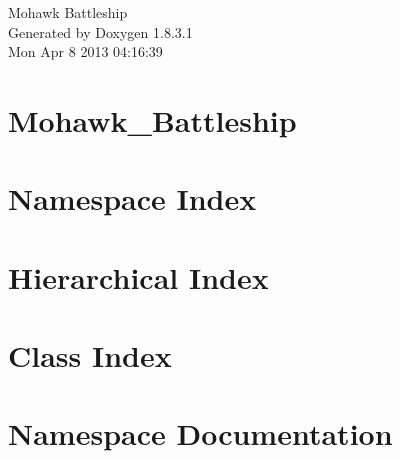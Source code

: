 \documentclass{book}
\begin{document}
\hypersetup{pageanchor=false,citecolor=blue}
\begin{titlepage}
\vspace*{7cm}
\begin{center}
{\Large Mohawk Battleship }\\
\vspace*{1cm}
{\large Generated by Doxygen 1.8.3.1}\\
\vspace*{0.5cm}
{\small Mon Apr 8 2013 04:16:39}\\
\end{center}
\end{titlepage}
\clearemptydoublepage
{}
\tableofcontents
\clearemptydoublepage
{}
\hypersetup{pageanchor=true,citecolor=blue}
\chapter{Mohawk\-\_\-\-Battleship}
\label{md_README}
\hypertarget{md_README}{}

\chapter{Namespace Index}

\chapter{Hierarchical Index}

\chapter{Class Index}

\chapter{Namespace Documentation}











\end{document}
